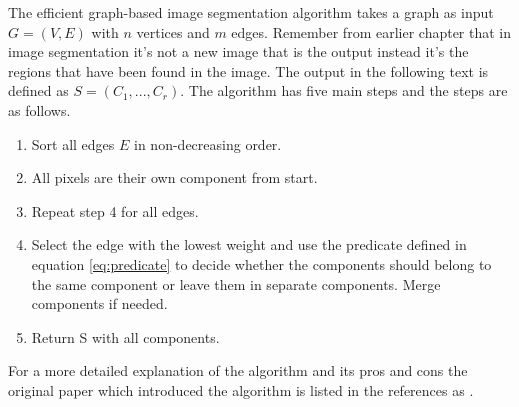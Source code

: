 The efficient graph-based image segmentation algorithm takes a graph as input
\(G = (V,E)\) with \(n\) vertices and \(m\) edges. Remember from earlier chapter
that in image segmentation it's not a new image that is the output instead it's
the regions that have been found in the image. The output in the following text
is defined as \(S = (C_1,...,C_r)\). The algorithm has five main steps and the
steps are as follows.
\begin{enumerate}
    \item Sort all edges \(E\) in non-decreasing order.
    \item All pixels are their own component from start.
    \item Repeat step 4 for all edges.
    \item Select the edge with the lowest weight and use the predicate defined in
        equation \ref{eq:predicate} to decide whether the components should belong
        to the same component or leave them in separate components. Merge components
        if needed.
    \item Return S with all components.
\end{enumerate}
For a more detailed explanation of the algorithm and its pros and cons the
original paper which introduced the algorithm is listed in the references as \cite{felzenszwalb2004}.




